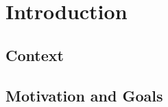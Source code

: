 \chapter{Introduction} \label{chap:intro}

\section*{}


\section{Context} \label{sec:context}
 

\section{Motivation and Goals} \label{sec:goals}

